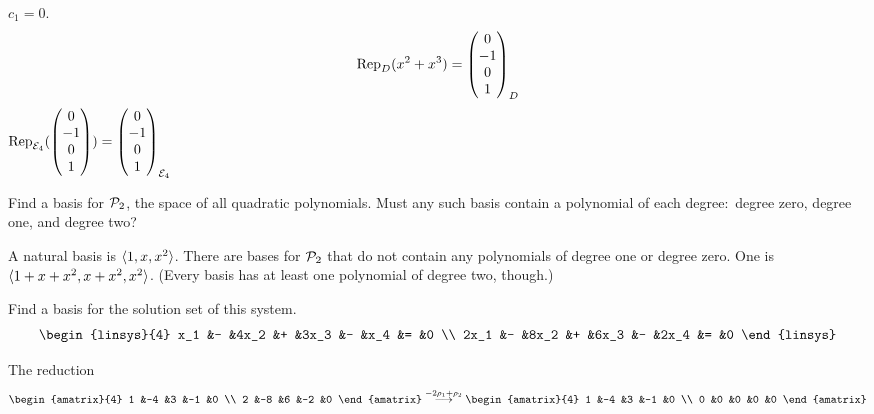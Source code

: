 \begin{exercises}
\begin{answer}
\begin{exparts}
           $c_1=0$.
           \begin{equation*}
              \rep{x^2+x^3}{D}=\colvec{0 \\ -1 \\ 0 \\ 1}_D
           \end{equation*} 
        \partsitem \( \rep{\colvec{0 \\ -1 \\ 0 \\ 1}}{\stdbasis_4}
                     =\colvec{0 \\ -1 \\ 0 \\ 1}_{\stdbasis_4} \)
      \end{exparts}  
    \end{answer}
  \item  
    Find a basis for \(  \polyspace_2 \), the space of all quadratic
    polynomials.
    Must any such basis contain a polynomial of each degree:~degree zero, 
    degree one, and degree two?
    \begin{answer}
      A natural basis is \( \sequence{1,x,x^2} \).
      There are bases for $\polyspace_2$ that do not contain any polynomials 
      of degree one or degree zero.
      One is \( \sequence{1+x+x^2,x+x^2,x^2} \).
      (Every basis has at least one polynomial of degree two, though.)
    \end{answer}
  \item
    Find a basis for the solution set of this system.
    \begin{equation*}
      \begin{linsys}{4}
         x_1  &-  &4x_2  &+  &3x_3  &-  &x_4  &=  &0  \\
        2x_1  &-  &8x_2  &+  &6x_3  &-  &2x_4 &=  &0  
      \end{linsys}
    \end{equation*}
    \begin{answer}
      The reduction
      \begin{equation*}
        \begin{amatrix}{4}
          1  &-4  &3  &-1  &0  \\
          2  &-8  &6  &-2  &0
        \end{amatrix}
        \grstep{-2\rho_1+\rho_2}
        \begin{amatrix}{4}
          1  &-4  &3  &-1  &0  \\
          0  &0   &0  &0   &0
        \end{amatrix}

\end{equation*}
\end{answer}
\end{exercises}
